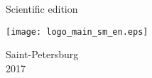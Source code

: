 \vspace{0pt plus1fill} %
%	


\begin{center}
	Scientific edition
\end{center}

%
\vspace{0pt plus4fill} %
\begin{center}%
		\texttt{[image: logo\_main\_sm\_en.eps]}
		
	
	
	Saint-Petersburg\\	
	2017
	
\end{center}%
\newpage
